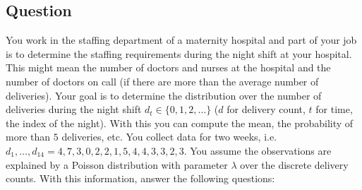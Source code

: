 \documentclass[12pt,a4paper]{article}
\begin{document}
\subsection{Question}
You work in the staffing department of a maternity hospital and part of your job is to determine the staffing requirements during the night shift at your hospital.  This might mean the number of doctors and nurses at the hospital and the number of doctors on call (if there are more than the average number of deliveries).  Your goal is to determine the distribution over the number of deliveries during the night shift $d_t \in \{0,1,2,\ldots\}$ ($d$ for delivery count, $t$ for time, the index of the night).  With this you can compute the mean, the probability of more than $5$ deliveries, etc.  You collect data for two weeks, i.e. $d_1, \ldots, d_{14} = 4, 7, 3, 0, 2, 2, 1, 5, 4, 4, 3, 3, 2, 3$.  You assume the observations are explained by a Poisson distribution with parameter $\lambda$ over the discrete delivery counts. With this information, answer the following questions:
%
\end{document}
